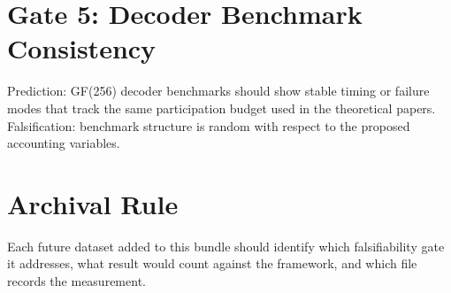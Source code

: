 \documentclass[11pt]{article}
\begin{document}
\section{Gate 5: Decoder Benchmark Consistency}
Prediction: GF(256) decoder benchmarks should show stable timing or failure modes that track the same participation budget used in the theoretical papers. Falsification: benchmark structure is random with respect to the proposed accounting variables.

\section{Archival Rule}
Each future dataset added to this bundle should identify which falsifiability gate it addresses, what result would count against the framework, and which file records the measurement.
\end{document}

